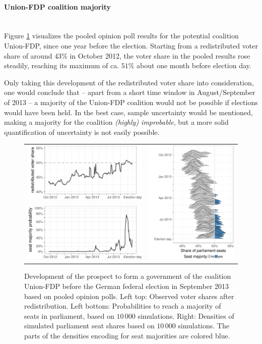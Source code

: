 \documentclass[smallcondensed]{svjour3}     %
\begin{document}
\paragraph{Union-FDP coalition majority} \ \\
Figure \ref{fig:2013_cdufdp} visualizes the pooled opinion poll results
for the potential coalition Union-FDP, since one year before the election.
Starting from a redistributed voter share of around $43\%$ in October 2012,
the voter share in the pooled results rose steadily, reaching its maximum
of ca. $51\%$ about one month before election day.

Only taking this development of the redistributed voter share into
consideration, one would conclude that -- apart from a short
time window in August/September of 2013 -- a majority of the Union-FDP
coalition would not be possible if elections would have been held.
In the best case, sample uncertainty would be mentioned, making
a majority for the coalition {\it (highly) improbable}, but a more
solid quantification of uncertainty is not easily possible.

\begin{figure}[H]\centering
\begin{tabular}{ll}
\includegraphics[height=.15\textwidth]{figures/2013_pooled_cdufdp_rawSharesRedist.pdf}
&
\multirow{2}{*}[13ex]{\includegraphics[height=30ex]{figures/2013_pooled_cdufdp_ridgeline.pdf}}
\\
\includegraphics[height=.15\textwidth]{figures/2013_pooled_cdufdp_prob.pdf}
\end{tabular}
\caption{Development of the prospect to form a government of the coalition Union-FDP before the German federal election in September 2013 based on pooled opinion polls.
Left top: Observed voter shares after redistribution. Left bottom: Probabilities to reach a majority of seats in parliament, based on $10\,000$ simulations. Right: Densities of simulated parliament seat shares based on $10\,000$ simulations. The parts of the densities encoding for seat majorities are colored blue.
\label{fig:2013_cdufdp}
}
\end{figure}
\end{document}
